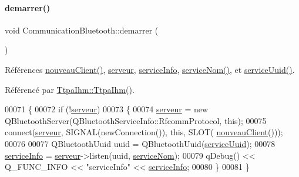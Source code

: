 \paragraph{\texorpdfstring{demarrer()}{demarrer()}}
{\footnotesize\ttfamily void Communication\+Bluetooth\+::demarrer (\begin{DoxyParamCaption}{ }\end{DoxyParamCaption})}



Références \hyperlink{class_communication_bluetooth_ab88c9bb8a1bd2c68e3d14fc3615be888}{nouveau\+Client()}, \hyperlink{class_communication_bluetooth_ace7c3b582db4257a20eb873ebfdf368a}{serveur}, \hyperlink{class_communication_bluetooth_a5ee2e50a8558ebb27b72a97343dabbf3}{service\+Info}, \hyperlink{ecran-_t_t_p_a_2communicationbluetooth_8h_a0b0819170cad3a534c62951bcbe70436}{service\+Nom()}, et \hyperlink{ecran-_t_t_p_a_2communicationbluetooth_8h_a89b03bf9986896053fdab3d4f80d7c04}{service\+Uuid()}.



Référencé par \hyperlink{class_ttpa_ihm_ab3ed4b37a93ff04842414d4a98861d66}{Ttpa\+Ihm\+::\+Ttpa\+Ihm()}.


\begin{DoxyCode}
00071 \{
00072     \textcolor{keywordflow}{if} (!\hyperlink{class_communication_bluetooth_ace7c3b582db4257a20eb873ebfdf368a}{serveur})
00073     \{
00074         \hyperlink{class_communication_bluetooth_ace7c3b582db4257a20eb873ebfdf368a}{serveur} = \textcolor{keyword}{new} QBluetoothServer(QBluetoothServiceInfo::RfcommProtocol, \textcolor{keyword}{this});
00075         connect(\hyperlink{class_communication_bluetooth_ace7c3b582db4257a20eb873ebfdf368a}{serveur}, SIGNAL(newConnection()), \textcolor{keyword}{this}, SLOT(
      \hyperlink{class_communication_bluetooth_ab88c9bb8a1bd2c68e3d14fc3615be888}{nouveauClient}()));
00076 
00077         QBluetoothUuid uuid = QBluetoothUuid(\hyperlink{ecran-_t_t_p_a_2communicationbluetooth_8h_a89b03bf9986896053fdab3d4f80d7c04}{serviceUuid});
00078         \hyperlink{class_communication_bluetooth_a5ee2e50a8558ebb27b72a97343dabbf3}{serviceInfo} = \hyperlink{class_communication_bluetooth_ace7c3b582db4257a20eb873ebfdf368a}{serveur}->listen(uuid, \hyperlink{ecran-_t_t_p_a_2communicationbluetooth_8h_a0b0819170cad3a534c62951bcbe70436}{serviceNom});
00079         qDebug() << Q\_FUNC\_INFO << \textcolor{stringliteral}{"serviceInfo"} << \hyperlink{class_communication_bluetooth_a5ee2e50a8558ebb27b72a97343dabbf3}{serviceInfo};
00080     \}
00081 \}
\end{DoxyCode}
\mbox{\label{class_communication_bluetooth_a546aae742ba77e90f99c4f12fbff908a}} 
